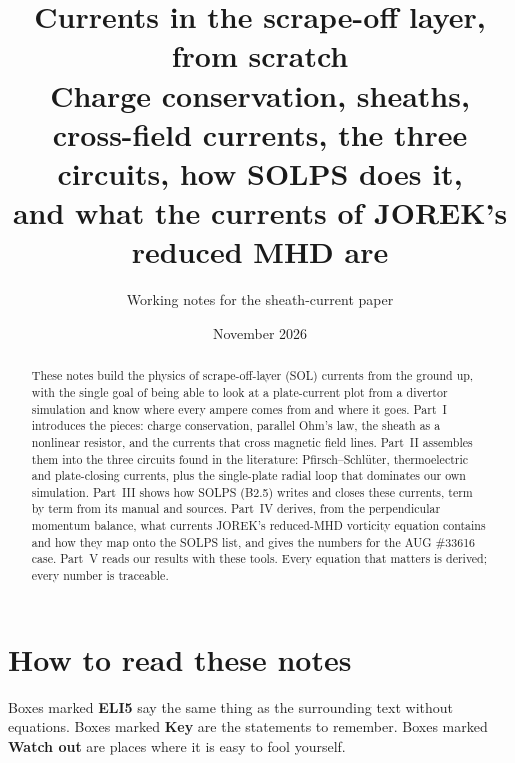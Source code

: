 \documentclass[11pt,a4paper]{article}
\title{Currents in the scrape-off layer, from scratch\\[4pt]
\large Charge conservation, sheaths, cross-field currents, the three circuits, how SOLPS does it,\\
and what the currents of JOREK's reduced MHD are}
\author{Working notes for the sheath-current paper}
\date{November 2026}
\begin{document}
\maketitle

\begin{abstract}
\noindent
These notes build the physics of scrape-off-layer (SOL) currents from the ground up, with the single goal of being able to
look at a plate-current plot from a divertor simulation and know where every ampere comes from and where it goes.
Part~I introduces the pieces: charge conservation, parallel Ohm's law, the sheath as a nonlinear resistor, and the
currents that cross magnetic field lines. Part~II assembles them into the three circuits found in the literature:
Pfirsch--Schl\"uter, thermoelectric and plate-closing currents, plus the single-plate radial loop that dominates our own
simulation. Part~III shows how SOLPS (B2.5) writes and closes these currents, term by term from its manual and sources.
Part~IV derives, from the perpendicular momentum balance, what currents JOREK's reduced-MHD vorticity equation contains
and how they map onto the SOLPS list, and gives the numbers for the AUG \#33616 case. Part~V reads our results with
these tools. Every equation that matters is derived; every number is traceable.
\end{abstract}

\tableofcontents
\clearpage

\section*{How to read these notes}

Boxes marked \textbf{ELI5} say the same thing as the surrounding text without equations. Boxes marked \textbf{Key}
are the statements to remember. Boxes marked \textbf{Watch out} are places where it is easy to fool yourself.
\end{document}
